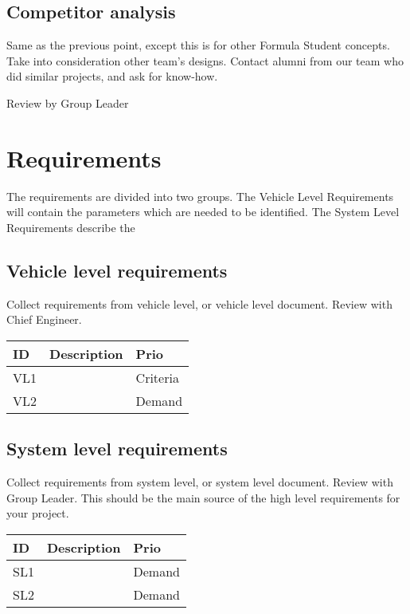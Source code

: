 \documentclass[12pt,a4paper]{article}
\begin{document}
	\subsection*{Competitor analysis}
		Same as the previous point, except this is for other Formula Student concepts. Take into consideration other team’s designs. Contact alumni from our team who did similar projects, and ask for know-how.
		
		Review by Group Leader
		
\section*{Requirements}
	The requirements are divided into two groups. The Vehicle Level Requirements will contain the parameters which are needed to be identified. The System Level Requirements describe the 
	
	\subsection*{Vehicle level requirements}
		Collect requirements from vehicle level, or vehicle level document. Review with Chief Engineer.
		\begin{table}[H]
			\centering
			\begin{tabular}{|l|l|l|}
				\hline
				\textbf{ID}& \textbf{Description} & \textbf{Prio} \\
				\hline
				VL1&  & Criteria \\
				\hline
				VL2&  & Demand \\
				\hline
			\end{tabular}
		\end{table}
		
	\subsection*{System level requirements}
		Collect requirements from system level, or system level document. Review with Group Leader. This should be the main source of the high level requirements for your project.
		\begin{table}[H]
			\centering
			\begin{tabular}{|l|l|l|}
				\hline
				\textbf{ID}& \textbf{Description} & \textbf{Prio} \\
				\hline
				SL1&  & Demand \\
				\hline
				SL2&  & Demand \\
				\hline
			\end{tabular}
		\end{table}
		
\end{document}
